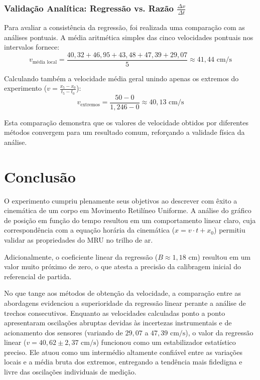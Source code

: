 \documentclass[12pt, a4paper]{article}
\begin{document}
\subsubsection*{Validação Analítica: Regressão vs. Razão $\frac{\Delta x}{\Delta t}$}
Para avaliar a consistência da regressão, foi realizada uma comparação com as análises pontuais. A média aritmética simples das cinco velocidades pontuais nos intervalos fornece:
\begin{equation}
    v_{\text{média local}} = \frac{40,32 + 46,95 + 43,48 + 47,39 + 29,07}{5} \approx 41,44 \text{ cm/s}
\end{equation}

Calculando também a velocidade média geral unindo apenas os extremos do experimento ($v = \frac{x_5 - x_0}{t_5 - t_0}$):
\begin{equation}
    v_{\text{extremos}} = \frac{50 - 0}{1,246 - 0} \approx 40,13 \text{ cm/s}
\end{equation}

Esta comparação demonstra que os valores de velocidade obtidos por diferentes métodos convergem para um resultado comum, reforçando a validade física da análise.

\section{Conclusão}
O experimento cumpriu plenamente seus objetivos ao descrever com êxito a cinemática de um corpo em Movimento Retilíneo Uniforme. A análise do gráfico de posição em função do tempo resultou em um comportamento linear claro, cuja correspondência com a equação horária da cinemática ($x = v \cdot t + x_0$) permitiu validar as propriedades do MRU no trilho de ar.

Adicionalmente, o coeficiente linear da regressão ($B \approx 1,18\text{ cm}$) resultou em um valor muito próximo de zero, o que atesta a precisão da calibragem inicial do referencial de partida.

No que tange aos métodos de obtenção da velocidade, a comparação entre as abordagens evidenciou a superioridade da regressão linear perante a análise de trechos consecutivos. Enquanto as velocidades calculadas ponto a ponto apresentaram oscilações abruptas devidas às incertezas instrumentais e de acionamento dos sensores (variando de $29,07$ a $47,39\text{ cm/s}$), o valor da regressão linear ($v = 40,62 \pm 2,37 \text{ cm/s}$) funcionou como um estabilizador estatístico preciso. Ele atuou como um intermédio altamente confiável entre as variações locais e a média bruta dos extremos, entregando a tendência mais fidedigna e livre das oscilações individuais de medição. 
\end{document}
